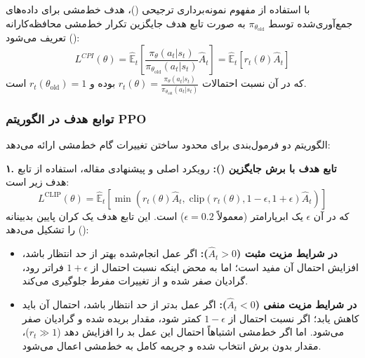 با استفاده از مفهوم نمونه‌برداری ترجیحی ()، هدف خط‌مشی برای داده‌های جمع‌آوری‌شده توسط $\pi_{\theta_{\text{old}}}$ به صورت تابع هدف جایگزین تکرار خط‌مشی محافظه‌کارانه () \cite{kakade2002approximately} تعریف می‌شود:
\begin{equation}
	L^{CPI}(\theta) = \hat{\mathbb{E}}_t \left[ \frac{\pi_\theta(a_t | s_t)}{\pi_{\theta_{\text{old}}}(a_t | s_t)} \hat{A}_t \right] = \hat{\mathbb{E}}_t \left[ r_t(\theta) \hat{A}_t \right]
\end{equation}
که در آن نسبت احتمالات $r_t(\theta) = \frac{\pi_\theta(a_t | s_t)}{\pi_{\theta_{\text{old}}}(a_t | s_t)}$ بوده و $r_t(\theta_{\text{old}}) = 1$ است.

\subsubsection*{توابع هدف در الگوریتم PPO}

الگوریتم  دو فرمول‌بندی برای محدود ساختن تغییرات گام خط‌مشی ارائه می‌دهد:

\textbf{۱. تابع هدف با برش جایگزین ():}
رویکرد اصلی و پیشنهادی مقاله، استفاده از تابع هدف زیر است:
\begin{equation}
	L^{\text{CLIP}}(\theta) = \hat{\mathbb{E}}_t \left[ \min \left( r_t(\theta) \hat{A}_t, \; \text{clip}(r_t(\theta), 1-\epsilon, 1+\epsilon) \hat{A}_t \right) \right]
\end{equation}
که در آن $\epsilon$ یک ابرپارامتر (معمولاً $\epsilon = 0.2$) است. این تابع هدف یک کران پایین بدبینانه () را تشکیل می‌دهد:
\begin{itemize}
	\item \textbf{در شرایط مزیت مثبت ($\hat{A}_t > 0$):} اگر عمل انجام‌شده بهتر از حد انتظار باشد، افزایش احتمال آن مفید است؛ اما به محض اینکه نسبت احتمال از $1+\epsilon$ فراتر رود، گرادیان صفر شده و از تغییرات مفرط جلوگیری می‌کند.
	\item \textbf{در شرایط مزیت منفی ($\hat{A}_t < 0$):} اگر عمل بدتر از حد انتظار باشد، احتمال آن باید کاهش یابد؛ اگر نسبت احتمال از $1-\epsilon$ کمتر شود، مقدار بریده شده و گرادیان صفر می‌شود. اما اگر خط‌مشی اشتباهاً احتمال این عمل بد را افزایش دهد ($r_t \gg 1$)، مقدار بدون برش انتخاب شده و جریمه کامل به خط‌مشی اعمال می‌شود.
\end{itemize}


